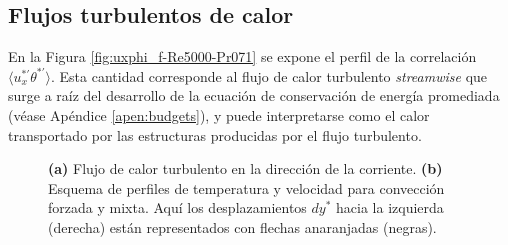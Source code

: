 \subsection{Flujos turbulentos de calor} 

En la Figura \ref{fig:uxphi_f-Re5000-Pr071} se expone el perfil de la correlación $\langle u_x^{\ast \prime } \theta^{\ast \prime } \rangle$. Esta cantidad corresponde al flujo de calor turbulento \textit{streamwise} que surge a raíz del desarrollo de la ecuación de conservación de energía promediada (véase Apéndice \ref{apen:budgets}), y puede interpretarse como el calor transportado por las estructuras producidas por el flujo turbulento.  

\begin{figure}[H]
  \centering
    \caption{\textbf{(a)} Flujo de calor turbulento en la dirección de la corriente. \textbf{(b)} Esquema de perfiles de temperatura y velocidad para convección forzada y mixta. Aquí los desplazamientos $dy^*$ hacia la izquierda (derecha) están representados con flechas anaranjadas (negras).}
    \label{fig:rms-Re5000-Pr071}
\end{figure}

